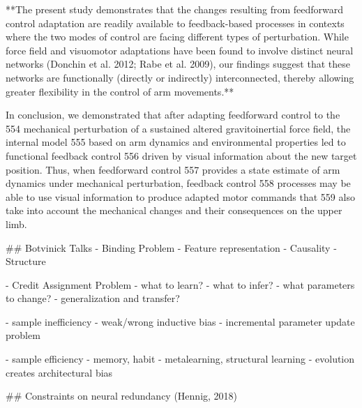 \documentclass[../main.tex]{subfiles}
\begin{document}
{{**The  present  study  demonstrates  that  the  changes resulting  from  feedforward  control  adaptation  are  readily  available  to  feedback-based processes  in  contexts  where  the  two  modes  of  control  are  facing  different  types  of perturbation.  While  force  field  and  visuomotor  adaptations  have  been  found  to  involve distinct neural networks (Donchin et al. 2012; Rabe et al. 2009), our findings suggest that these  networks  are  functionally  (directly  or  indirectly)  interconnected,  thereby  allowing greater flexibility in the control of arm movements.**

In  conclusion,  we  demonstrated  that  after  adapting  feedforward control  to  the 554 mechanical perturbation of a sustained altered gravitoinertial force field, the internal model 555 based  on  arm  dynamics  and  environmental  properties  led  to  functional  feedback  control 556 driven by visual information about the new target position. Thus, when feedforward control 557 provides a state estimate of arm dynamics under mechanical perturbation, feedback control 558 processes may be able to use visual information to produce adapted motor commands that 559 also take into account the mechanical changes and their consequences on the upper limb.

## Botvinick Talks
- Binding Problem
	- Feature representation
	- Causality
	- Structure

- Credit Assignment Problem
	- what to learn?
	- what to infer?
	- what parameters to change?
	- generalization and transfer?

- sample inefficiency
	- weak/wrong inductive bias
	- incremental parameter update problem

  - sample efficiency
	- memory, habit
	- metalearning, structural learning
	- evolution creates architectural bias

## Constraints on neural redundancy (Hennig, 2018)

}}
\end{document}
